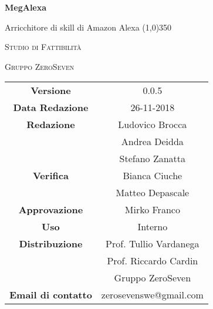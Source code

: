 \documentclass[a4paper,12pt]{book}
\author{Mirko Franco}
\date{26-11-2018}
\begin{document}
\begin{titlepage}
	\centering
	{\huge\bfseries MegAlexa\par}
	Arricchitore di skill di Amazon Alexa
	\line(1,0){350} \\
	{\scshape\LARGE Studio di Fattibilità \par}
	\vspace{1cm}
	{\scshape Gruppo ZeroSeven \par}
	\logo
	\begin{tabular}{c|c}
		{\hfill \textbf{Versione}} 			& 0.0.5			\\
		{\hfill\textbf{Data Redazione}} 	& 26-11-2018		\\ 
		{\hfill\textbf{Redazione}} 			&  		Ludovico Brocca \\ & Andrea Deidda\\ & Stefano Zanatta		\\
		{\hfill\textbf{Verifica}} 				&  					Bianca Ciuche \\ & Matteo Depascale\\ 
		{\hfill\textbf{Approvazione}} 		&  				Mirko Franco\\ 
		{\hfill\textbf{Uso}} 					& 		Interno		\\ 
		{\hfill\textbf{Distribuzione}} 			& 			Prof. Tullio Vardanega \\ & Prof. Riccardo Cardin \\ & Gruppo ZeroSeven		\\ 
		{\hfill\textbf{Email di contatto}} & zerosevenswe@gmail.com \\
	\end{tabular}
\end{titlepage}
	

	
\label{LastFrontPage}
	\newpage	
	
	\pagestyle{mymain}
	\tableofcontents
		
	
	
	
			
	
		
	
	\label{LastPage}
\end{document}
